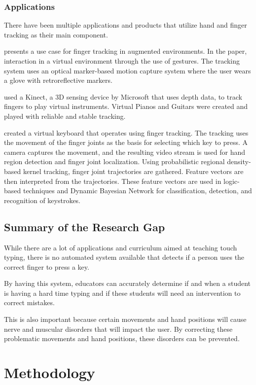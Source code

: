 \documentclass{report}
\begin{document}
\subsection{Applications}

There have been multiple applications and products that utilize hand and finger
tracking as their main component.

\cite{dorf2001} presents a use case for finger tracking in augmented
environments. In the paper, interaction in a virtual environment through the use
of gestures. The tracking system uses an optical marker-based motion capture
system where the user wears a glove with retroreflective markers.

\cite{chiang2014} used a Kinect, a 3D sensing device by Microsoft that
uses depth data, to track fingers to play virtual instruments. Virtual Pianos
and Guitars were created and played with reliable and stable tracking.

\cite{yousaf2014} created a virtual keyboard that operates using finger
tracking. The tracking uses the movement of the finger joints as the basis for
selecting which key to press. A camera captures the movement, and the resulting
video stream is used for hand region detection and finger joint localization.
Using probabilistic regional density-based kernel tracking, finger joint
trajectories are gathered. Feature vectors are then interpreted from the
trajectories. These feature vectors are used in logic-based techniques and
Dynamic Bayesian Network for classification, detection, and recognition of
keystrokes.

\section{Summary of the Research Gap}
While there are a lot of applications and curriculum aimed at teaching touch
typing, there is no automated system available that detects if a person uses the
correct finger to press a key.

By having this system, educators can accurately determine if and when a student
is having a hard time typing and if these students will need an intervention to
correct mistakes.

This is also important because certain movements and hand positions will cause
nerve and muscular disorders that will impact the user. By correcting these
problematic movements and hand positions, these disorders can be prevented.

\chapter{Methodology}
\end{document}
